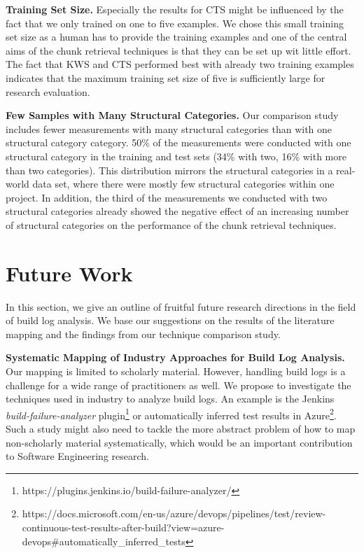 \textbf{Training Set Size.}
Especially the results for CTS might be influenced by the fact that we
only trained on one to five examples.
We chose this small training
set size as a human has to provide the training examples and one of
the central aims of the chunk retrieval techniques is that they can be
set up wit little effort.
The fact that KWS and CTS performed best
with already two training examples indicates that the maximum training
set size of five is sufficiently large for research evaluation.

\textbf{Few Samples with Many Structural Categories.}
Our comparison study includes fewer measurements with many structural
categories than with one structural category category.
50\% of the measurements were conducted with one structural category
in the training and test sets
(34\% with two, 16\% with more than two categories).
This distribution mirrors the
structural categories in a real-world data set, where there were
mostly few structural categories within one project.
In addition, the
third of the measurements we conducted with two structural categories
already showed the negative effect of an increasing number of
structural categories on the performance of the chunk retrieval
techniques.

\section{Future Work}
In this section, we give an outline of fruitful future
research directions in the field of build log analysis.
We base our
suggestions on the results of the literature mapping and the
findings from our technique comparison study.

\textbf{Systematic Mapping of Industry Approaches for Build
Log Analysis.}	Our mapping is limited to scholarly material.
However,
handling build logs is a challenge for a wide range of practitioners
as well.
We propose to investigate the techniques used in industry to
analyze build logs.
An example is the
Jenkins \emph{build-failure-analyzer}
plugin\footnote{https://plugins.jenkins.io/build-failure-analyzer/} or automatically inferred
test results in Azure\footnote{https://docs.microsoft.com/en-us/azure/devops/pipelines/test/review-continuous-test-results-after-build?view=azure-devops\#automatically\_inferred\_tests}.
Such a study might
also need to tackle the more abstract problem of how to map
non-scholarly material systematically, which would be an important
contribution to Software Engineering research.


